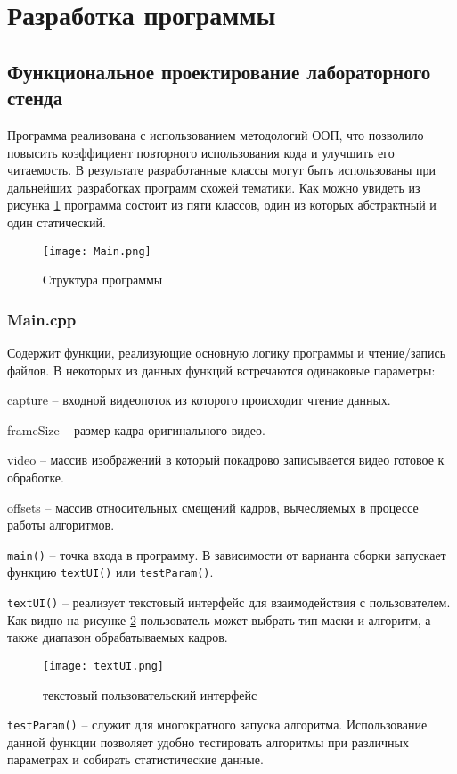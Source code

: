\section{Разработка программы}
\subsection{Функциональное проектирование лабораторного стенда}
Программа реализована с использованием методологий ООП, что позволило повысить коэффициент повторного использования кода и улучшить его читаемость. В результате разработанные классы могут быть использованы при дальнейших разработках программ схожей тематики. Как можно увидеть из рисунка \ref{fig:uml} программа состоит из пяти классов, один из которых абстрактный и один статический. 
\begin{figure}[h]
    \centering   
    \texttt{[image: Main.png]} 
    \caption{Структура программы}
    \label{fig:uml}
\end{figure} 

\subsubsection{Main.cpp~}
Содержит функции, реализующие основную логику программы и чтение/запись файлов. В некоторых из данных функций встречаются одинаковые параметры:

capture -- входной видеопоток из которого происходит чтение данных.

frameSize -- размер кадра оригинального видео.

video -- массив изображений в который покадрово записывается видео готовое к обработке.

offsets -- массив относительных смещений кадров, вычесляемых в процессе работы алгоритмов.

\texttt{main()} -- точка входа в программу. В зависимости от варианта сборки запускает функцию \texttt{textUI()} или \texttt{testParam()}.

\texttt{textUI()} -- реализует текстовый интерфейс для взаимодействия с пользователем. Как видно на рисунке \ref{fig:textUI} пользователь может выбрать тип маски и алгоритм, а также диапазон обрабатываемых кадров.
\begin{figure}[h]
    \centering   
    \texttt{[image: textUI.png]} 
    \caption{текстовый пользовательский интерфейс}
    \label{fig:textUI}
\end{figure} 

\texttt{testParam()} -- служит для многократного запуска алгоритма. Использование данной функции позволяет удобно тестировать алгоритмы при различных параметрах и собирать статистические данные. 

